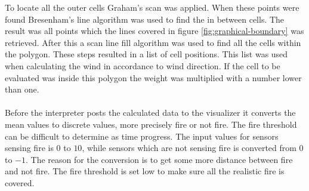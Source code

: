 To locate all the outer cells Graham's scan \cite{graham} was applied. When these points were found Bresenham's line algorithm was used to find the in between cells. The result was all points which the lines covered in figure \ref{fig:graphical-boundary} was retrieved. After this a scan line fill algorithm was used to find all the cells within the polygon. These steps resulted in a list of cell positions. This list was used when calculating the wind in accordance to wind direction. If the cell to be evaluated was inside this polygon the weight was multiplied with a number lower than one.
\\\\
Before the interpreter posts the calculated data to the visualizer it converts the mean values to discrete values, more precisely fire or not fire. The fire threshold can be difficult to determine as time progress. The input values for sensors sensing fire is $0 $ to $10$, while sensors which are not sensing fire is converted from $ 0 $ to $ -1 $. The reason for the conversion is to get some more distance between fire and not fire. The fire threshold is set low to make sure all the realistic fire is covered.